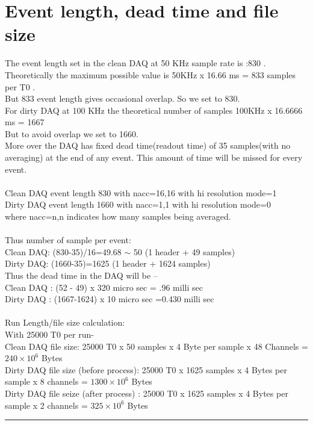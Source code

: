 \documentclass[12pt]{article}
\begin{document}
\section{Event length, dead time and file size}
The  event length set in the clean DAQ at 50 KHz sample rate is :830 . Theoretically the maximum possible value is 50KHz x 16.66 ms = 833 samples per T0 . \\
But 833 event length gives occasional overlap. So we set to 830. \\
For dirty DAQ at 100 KHz the theoretical number of samples 100KHz x 16.6666 ms = 1667 \\
But to avoid overlap we set to 1660. \\
More over the DAQ has fixed dead time(readout time) of 35 samples(with no averaging) at the end of any event. This amount of time will be missed for every event.\\
\\
Clean DAQ event length 830 with nacc=16,16 with hi resolution mode=1\\
Dirty DAQ event length 1660 with nacc=1,1 with hi resolution mode=0\\
where nacc=n,n indicates how many samples being averaged.\\
\\
Thus number of sample per event:\\
Clean DAQ: (830-35)/16=49.68 $\sim$ 50  (1 header + 49 samples)\\
Dirty DAQ: (1660-35)=1625 (1 header + 1624 samples) \\
Thus the dead time in the DAQ will be --\\
Clean DAQ : (52 - 49) x 320 micro sec = .96 milli sec\\
Dirty DAQ : (1667-1624) x 10 micro sec =0.430 milli sec\\\\
Run Length/file size calculation:\\
With 25000 T0 per run- \\
Clean DAQ file size: 25000 T0 x 50 samples x 4 Byte per sample x 48 Channels =$240 \times 10^6$ Bytes\\
Dirty DAQ file size (before process): 25000 T0 x 1625 samples x 4 Bytes per sample x 8 channels = $1300 \times 10^6$ Bytes\\
Dirty DAQ file seize (after process) : 25000 T0 x 1625 samples x 4 Bytes per sample x 2 channels = $325 \times 10^6$ Bytes\\
\noindent
{\color{red} \rule{\linewidth}{1mm} }
 
\end{document}
